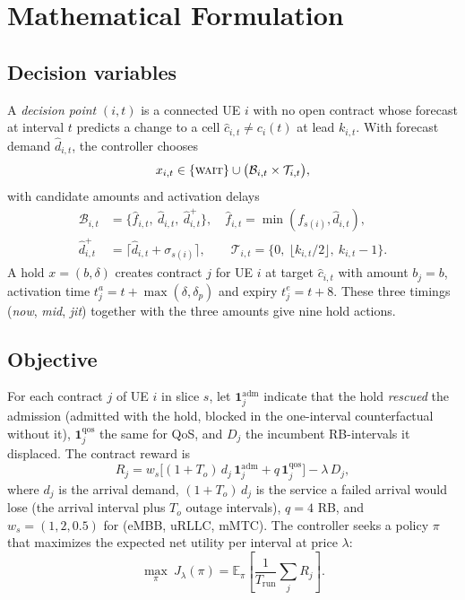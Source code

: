 \documentclass[conference]{IEEEtran}
\begin{document}
\section{Mathematical Formulation}\label{sec:formulation}
\subsection{Decision variables}
A \emph{decision point} $(i,t)$ is a connected UE $i$ with no open contract whose forecast at interval $t$ predicts a change to a cell $\hat c_{i,t}\neq c_i(t)$ at lead $k_{i,t}$. With forecast demand $\hat d_{i,t}$, the controller chooses
\begin{equation}\label{eq:decision}
x_{i,t}\in\{\textsc{wait}\}\cup\big(\mathcal{B}_{i,t}\times\mathcal{T}_{i,t}\big),
\end{equation}
with candidate amounts and activation delays
\begin{align}
\mathcal{B}_{i,t}&=\{\hat f_{i,t},\ \hat d_{i,t},\ \hat d^{+}_{i,t}\},\quad \hat f_{i,t}=\min(f_{s(i)},\hat d_{i,t}),\label{eq:amounts}\\
\hat d^{+}_{i,t}&=\big\lceil \hat d_{i,t}+\sigma_{s(i)}\big\rceil,\qquad
\mathcal{T}_{i,t}=\{0,\ \lfloor k_{i,t}/2\rfloor,\ k_{i,t}-1\}.\label{eq:timing}
\end{align}
A hold $x=(b,\delta)$ creates contract $j$ for UE $i$ at target $\hat c_{i,t}$ with amount $b_j=b$, activation time $t^{a}_j=t+\max(\delta,\delta_p)$ and expiry $t^{e}_j=t+8$. These three timings (\emph{now}, \emph{mid}, \emph{jit}) together with the three amounts give nine hold actions.

\subsection{Objective}
For each contract $j$ of UE $i$ in slice $s$, let $\mathbf{1}^{\mathrm{adm}}_j$ indicate that the hold \emph{rescued} the admission (admitted with the hold, blocked in the one-interval counterfactual without it), $\mathbf{1}^{\mathrm{qos}}_j$ the same for QoS, and $D_j$ the incumbent RB-intervals it displaced. The contract reward is
\begin{equation}\label{eq:reward}
R_j=w_s\Big[(1+T_o)\,d_j\,\mathbf{1}^{\mathrm{adm}}_j+q\,\mathbf{1}^{\mathrm{qos}}_j\Big]-\lambda\,D_j,
\end{equation}
where $d_j$ is the arrival demand, $(1+T_o)\,d_j$ is the service a failed arrival would lose (the arrival interval plus $T_o$ outage intervals), $q=4$ RB, and $w_s=(1,2,0.5)$ for (eMBB, uRLLC, mMTC). The controller seeks a policy $\pi$ that maximizes the expected net utility per interval at price $\lambda$:
\begin{equation}\label{eq:objective}
\max_{\pi}\ J_\lambda(\pi)=\mathbb{E}_\pi\!\left[\frac{1}{T_{\mathrm{run}}}\sum_{j}R_j\right].
\end{equation}
\end{document}
